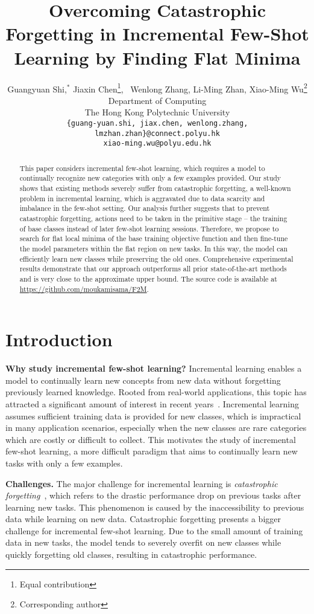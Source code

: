 \documentclass{article}
\title{Overcoming Catastrophic Forgetting in Incremental Few-Shot Learning by Finding Flat Minima}
\author{Guangyuan Shi,$^{*}$ Jiaxin Chen\thanks{Equal contribution}, ~Wenlong Zhang, Li-Ming Zhan, Xiao-Ming Wu\thanks{Corresponding author}
  \\
  Department of Computing\\
  The Hong Kong Polytechnic University\\
  \texttt{\{guang-yuan.shi, jiax.chen, wenlong.zhang, lmzhan.zhan\}@connect.polyu.hk}\\
  \texttt{xiao-ming.wu@polyu.edu.hk}\\
}
\begin{document}
\maketitle

\begin{abstract}
 This paper considers incremental few-shot learning, which requires a model to continually recognize new categories with only a few examples provided. Our study shows that existing methods severely suffer from catastrophic forgetting, a well-known problem in incremental learning, which is aggravated due to data scarcity and imbalance in the few-shot setting. Our analysis further suggests that to prevent catastrophic forgetting, actions need to be taken in the primitive stage -- the training of base classes instead of later few-shot learning sessions. Therefore, we propose to search for flat local minima of the base training objective function and then fine-tune the model parameters within the flat region on new tasks. In this way, the model can efficiently learn new classes while preserving the old ones. Comprehensive experimental results demonstrate that our approach outperforms all prior state-of-the-art methods and is very close to the approximate upper bound. The source code is available at \url{https://github.com/moukamisama/F2M}.
\end{abstract} \section{Introduction}\label{sec:introduction}

\textbf{Why study incremental few-shot learning?} Incremental learning enables a model to continually learn new concepts from new data without forgetting previously learned knowledge. Rooted from real-world applications, this topic has attracted a significant amount of interest in recent years~\citep{chaudhry2018riemannian,kuzborskij2013n,Lwf,icarl,kemker2017fearnet}. Incremental learning assumes sufficient training data is provided for new classes, which is impractical in many application scenarios, especially when the new classes are rare categories which are costly or difficult to collect. This motivates the study of incremental few-shot learning, a more difficult paradigm that aims to continually learn new tasks with only a few examples. 

\textbf{Challenges.} The major challenge for incremental learning is \emph{catastrophic} \emph{forgetting}~\citep{goodfellow2013empirical,kirkpatrick2017overcoming,mccloskey1989catastrophic}, which refers to the drastic performance drop on previous tasks after learning new tasks. This phenomenon is caused by the inaccessibility to previous data while learning on new data. Catastrophic forgetting presents a bigger challenge for incremental few-shot learning. Due to the small amount of training data in new tasks, the model tends to severely overfit on new classes while quickly forgetting old classes, resulting in catastrophic performance.
 
\end{document}

